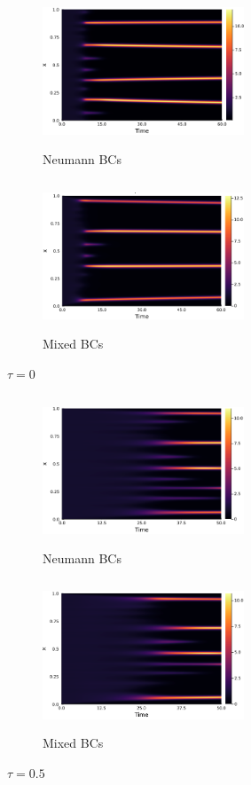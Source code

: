 \documentclass[12pt,a4paper]{article}
\begin{document}
\begin{figure}[H]
    \begin{subfigure}[b]{0.45\linewidth}
        \centering
        \includegraphics[width=6cm,height = 4.5cm]{t0neumannfixed.png}
        \caption{Neumann BCs}
        \label{}
    \end{subfigure}
    \hfill
    \begin{subfigure}[b]{0.45\linewidth}
        \centering
        \includegraphics[width=6cm,height = 4.5cm]{t0mixedfixed.png}
        \caption{Mixed BCs}
        \label{}
    \end{subfigure}
    \caption{$\tau=0$}
\end{figure}
\begin{figure}[H]
    \begin{subfigure}[b]{0.45\linewidth}
        \centering
        \includegraphics[width=6cm,height = 4.5cm]{t05neumannfixed.png}
        \caption{Neumann BCs}
        \label{}
    \end{subfigure}
    \hfill
    \begin{subfigure}[b]{0.45\linewidth}
        \centering
        \includegraphics[width=6cm,height = 4.5cm]{t05mixedfixed.png}
        \caption{Mixed BCs}
        \label{}
    \end{subfigure}
    \caption{$\tau=0.5$}
\end{figure}
\end{document}

